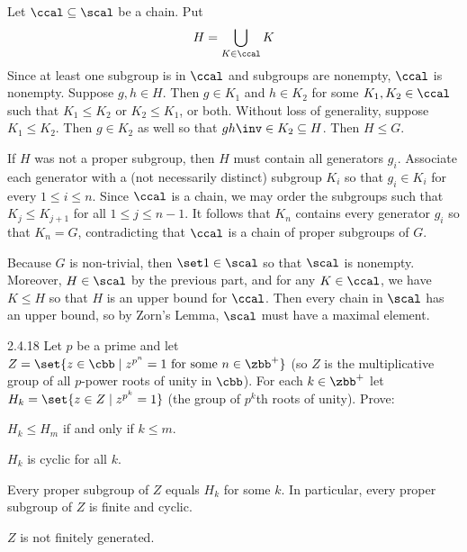 \begin{solenum}[spsol]
    \item Let $\ccal \subseteq \scal$ be a chain.
	Put
    \[
    	H = \bigcup_{K \in \ccal}K
    \]
    Since at least one subgroup is in $\ccal$ and subgroups are nonempty, $\ccal$ is nonempty.
	Suppose $g, h \in H$.
	Then $g \in K_1$ and $h \in K_2$ for some $K_1, K_2 \in \ccal$ such that $K_1 \leq K_2$ or $K_2 \leq K_1$, or both.
	Without loss of generality, suppose $K_1 \leq K_2$.
	Then $g \in K_2$ as well so that $gh\inv \in K_2 \subseteq H$.
	Then $H \leq G$.
    \item If $H$ was not a proper subgroup, then $H$ must contain all generators $g_i$.
	Associate each generator with a (not necessarily distinct) subgroup $K_i$ so that $g_i \in K_i$ for every $1 \leq i \leq n$.
	Since $\ccal$ is a chain, we may order the subgroups such that $K_j \leq K_{j + 1}$ for all $1 \leq j \leq n - 1$.
	It follows that $K_n$ contains every generator $g_i$ so that $K_n = G$, contradicting that $\ccal$ is a chain of proper subgroups of $G$. 
    \item Because $G$ is non-trivial, then $\set 1 \in \scal$ so that $\scal$ is nonempty.
	Moreover, $H \in \scal$ by the previous part, and for any $K \in \ccal$, we have $K \leq H$ so that $H$ is an upper bound for $\ccal$.
	Then every chain in $\scal$ has an upper bound, so by Zorn's Lemma, $\scal$ must have a maximal element.
\end{solenum}

\begin{exercise}{2.4.18} 
    Let $p$ be a prime and let $Z = \set{z\in \cbb\mid z^{p^n}=1 \text{ for some } n\in \zbb^+}$ (so $Z$ is the multiplicative group of all $p$-power roots of unity in $\cbb$).
	For each $k\in \zbb^+$ let $H_k = \set{z\in Z \mid z^{p^k}=1}$ (the group of $p^k$th roots of unity).
	Prove:
    \begin{subexercises}
        \item $H_k \le H_m$ if and only if $k\le m$.
        \item $H_k$ is cyclic for all $k$.
        \item Every proper subgroup of $Z$ equals $H_k$ for some $k$.  
        In particular, every proper subgroup of $Z$ is finite and cyclic.
        \item $Z$ is not finitely generated.
    \end{subexercises}
\end{exercise}

